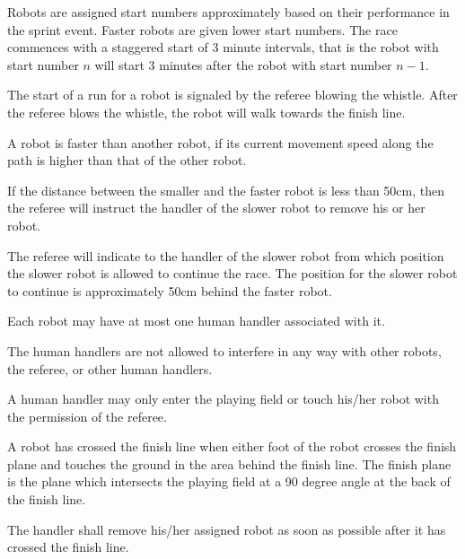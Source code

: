 \documentclass[12pt]{hurocup}
\begin{document}
\begin{lawlist}[MR]

\item Robots are assigned start numbers approximately based on their
  performance in the sprint event. Faster robots are given lower start
  numbers. The race commences with a staggered start of 3 minute
  intervals, that is the robot with start number $n$ will start 3
  minutes after the robot with start number $n-1$.

\item The start of a run for a robot is signaled by the referee
  blowing the whistle. After the referee blows the whistle, the robot
  will walk towards the finish line.

\item \label{catch-up} A robot is faster than another robot, if its
  current movement speed along the path is higher than that of the
  other robot.

\item If the distance between the smaller and the faster robot is less
  than 50cm, then the referee will instruct the handler of the slower
  robot to remove his or her robot.

\item The referee will indicate to the handler of the slower robot
  from which position the slower robot is allowed to continue the
  race. The position for the slower robot to continue is approximately
  50cm behind the faster robot.

\item Each robot may have at most one human handler associated with
  it.

\item \label{handler1} The human handlers are not allowed to
  interfere in any way with other robots, the referee, or other human
  handlers.

\item \label{handler2} A human handler may only enter the playing
  field or touch his/her robot with the permission of the referee.

\item A robot has crossed the finish line when either
  foot of the robot crosses the finish plane and touches the ground in
  the area behind the finish line. The finish plane is the plane which
  intersects the playing field at a 90 degree angle at the back of the
  finish line.

\item The handler shall remove his/her assigned robot as soon as
  possible after it has crossed the finish line.


\end{lawlist}
\end{document}
